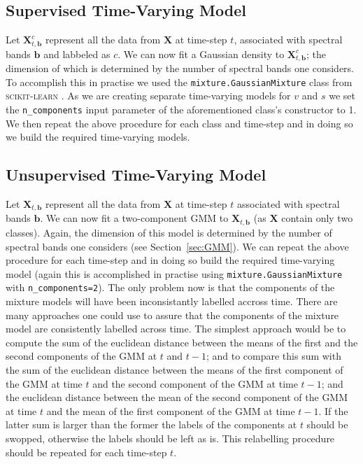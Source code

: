 \documentclass{article}
\begin{document}
\subsection{Supervised Time-Varying Model}
\label{sec:sup_model}
Let $\mathbf{X}_{t,\mathbf{b}}^c$ represent all the data from $\mathbf{X}$ at time-step $t$, associated with spectral bands $\mathbf{b}$ and labbeled as $c$. We can now fit a Gaussian density 
to $\mathbf{X}_{t,\mathbf{b}}^c$; the dimension of which is determined by the number of spectral bands one considers. To accomplish this in practise we used the \texttt{mixture.GaussianMixture} class from \textsc{scikit-learn} \cite{scikitlearn}. 
As we are creating separate time-varying models for $v$ and $s$ we set the \texttt{n\_components} input parameter of the aforementioned class's constructor to 1. We then repeat the above procedure for each class and time-step and in 
doing so we build the required time-varying models. %

\subsection{Unsupervised Time-Varying Model}
Let $\mathbf{X}_{t,\mathbf{b}}$ represent all the data from $\mathbf{X}$ at time-step $t$ associated with spectral bands $\mathbf{b}$. We can now fit a two-component GMM to $\mathbf{X}_{t,\mathbf{b}}$ (as $\mathbf{X}$ contain only two classes). Again,
the dimension of this model is determined by the number of spectral bands one considers (see Section~\ref{sec:GMM}). We can repeat the above procedure for each time-step and in doing so 
build the required time-varying model (again this is accomplished in practise using \texttt{mixture.GaussianMixture} with \texttt{n\_components=2}). The only problem now is that the components of the mixture models will have been inconsistantly labelled accross time. There are many approaches one could use to assure 
that the components of the mixture model are consistently labelled across time. The simplest approach would be to compute the sum of the euclidean distance between the means of 
the first and the second components of the GMM at $t$ and $t-1$; and to compare this sum with the sum of the euclidean distance between the means of the first component of the GMM at time $t$ and 
the second component of the GMM at time $t-1$; and the euclidean distance between the mean of the second component of the GMM at time $t$ and the mean of the first component of the GMM at time $t-1$. If the latter sum is 
larger than the former the labels of the components at $t$ should be swopped, otherwise the labels should be left as is. This relabelling procedure should be repeated for each time-step $t$.
\end{document}
